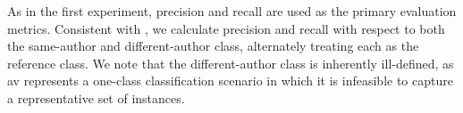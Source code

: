 As in the first experiment, precision and recall are used as the primary evaluation metrics. 
Consistent with \citet{koppel_determining_2014}, we calculate precision and recall with respect to both the same-author and different-author class, alternately treating each as the reference class.
We note that the different-author class is inherently ill-defined, as \ac{av} represents a one-class classification scenario in which it is infeasible to capture a representative set of instances.